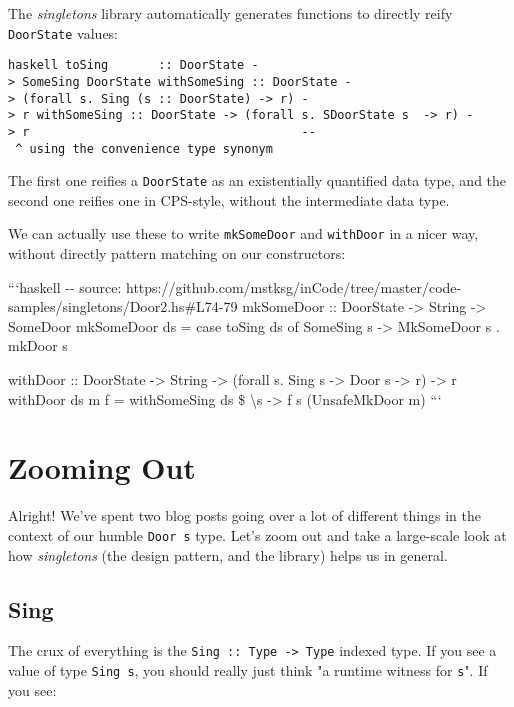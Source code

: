 \documentclass[]{article}
\begin{document}
The \emph{singletons} library automatically generates functions to directly
reify \texttt{DoorState} values:

\texttt{haskell\ toSing\ \ \ \ \ \ \ ::\ DoorState\ -\textgreater{}\ SomeSing\ DoorState\ withSomeSing\ ::\ DoorState\ -\textgreater{}\ (forall\ s.\ Sing\ (s\ ::\ DoorState)\ -\textgreater{}\ r)\ -\textgreater{}\ r\ withSomeSing\ ::\ DoorState\ -\textgreater{}\ (forall\ s.\ SDoorState\ s\ \ -\textgreater{}\ r)\ -\textgreater{}\ r\ \ \ \ \ \ \ \ \ \ \ \ \ \ \ \ \ \ \ \ \ \ \ \ \ \ \ \ \ \ \ \ \ \ \ \ \ \ -\/-\ \^{}\ using\ the\ convenience\ type\ synonym}

The first one reifies a \texttt{DoorState} as an existentially quantified data
type, and the second one reifies one in CPS-style, without the intermediate data
type.

We can actually use these to write \texttt{mkSomeDoor} and \texttt{withDoor} in
a nicer way, without directly pattern matching on our constructors:

```haskell -\/- source:
https://github.com/mstksg/inCode/tree/master/code-samples/singletons/Door2.hs\#L74-79
mkSomeDoor :: DoorState -\textgreater{} String -\textgreater{} SomeDoor
mkSomeDoor ds = case toSing ds of SomeSing s -\textgreater{} MkSomeDoor s .
mkDoor s

withDoor :: DoorState -\textgreater{} String -\textgreater{} (forall s. Sing s
-\textgreater{} Door s -\textgreater{} r) -\textgreater{} r withDoor ds m f =
withSomeSing ds \$ \textbackslash{}s -\textgreater{} f s (UnsafeMkDoor m) ```

\section{Zooming Out}

Alright! We've spent two blog posts going over a lot of different things in the
context of our humble \texttt{Door\ s} type. Let's zoom out and take a
large-scale look at how \emph{singletons} (the design pattern, and the library)
helps us in general.

\subsection{Sing}

The crux of everything is the \texttt{Sing\ ::\ Type\ -\textgreater{}\ Type}
indexed type. If you see a value of type \texttt{Sing\ s}, you should really
just think "a runtime witness for \texttt{s}". If you see:
\end{document}
